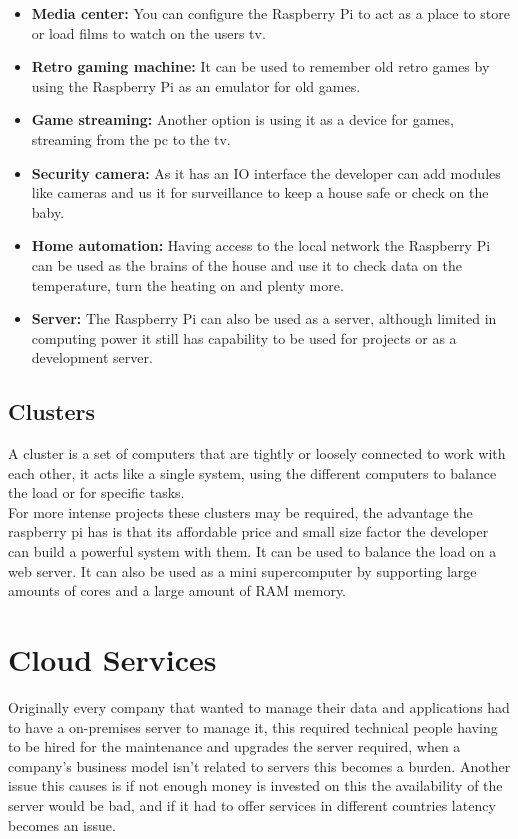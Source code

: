 \begin{itemize}
	\item {\textbf{Media center:} You can configure the Raspberry Pi to act as a place to store or load films to watch on the users tv.}
	\item {\textbf{Retro gaming machine:} It can be used to remember old retro games by using the Raspberry Pi as an emulator for old games.}
	\item {\textbf{Game streaming:} Another option is using it as a device for games, streaming from the pc to the tv.}
	\item {\textbf{Security camera:} As it has an IO interface the developer can add modules like cameras and us it for surveillance to keep a house safe or check on the baby.}
	\item {\textbf{Home automation:} Having access to the local network the Raspberry Pi can be used as the brains of the house and use it to check data on the temperature, turn the heating on and plenty more.}
	\item {\textbf{Server:} The Raspberry Pi can also be used as a server, although limited in computing power it still has capability to be used for projects or as a development server.}
\end{itemize}

\subsection{Clusters}\label{sec:chap3_clusters}
A cluster is a set of computers that are tightly or loosely connected to work with each other, it acts like a single system, using the different computers to balance the load or for specific tasks.\\
For more intense projects these clusters may be required, the advantage the raspberry pi has is that its affordable price and small size factor the developer can build a powerful system with them. It can be used to balance the load on a web server. It can also be used as a mini supercomputer by supporting large amounts of cores and a large amount of RAM memory.

\section{Cloud Services}\label{sec:chap3_cloud}

Originally every company that wanted to manage their data and applications had to have a on-premises server to manage it, this required technical people having to be hired for the maintenance and upgrades the server required, when a company’s business model isn’t related to servers this becomes a burden. Another issue this causes is if not enough money is invested on this the availability of the server would be bad, and if it had to offer services in different countries latency becomes an issue.\\

